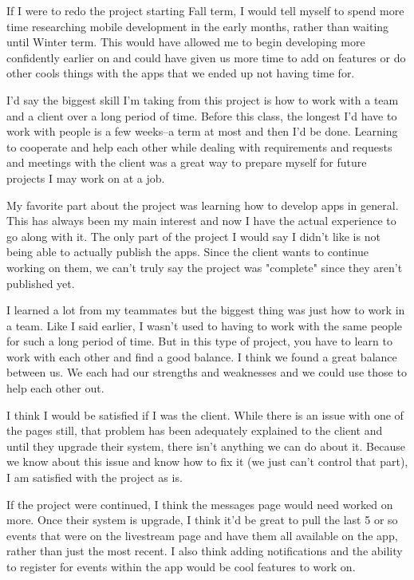 If I were to redo the project starting Fall term, I would tell myself to spend more time researching mobile development in the early months, rather than waiting until Winter term. This would have allowed me to begin developing more confidently earlier on and could have given us more time to add on features or do other cools things with the apps that we ended up not having time for.

I'd say the biggest skill I'm taking from this project is how to work with a team and a client over a long period of time. Before this class, the longest I'd have to work with people is a few weeks--a term at most and then I'd be done. Learning to cooperate and help each other while dealing with requirements and requests and meetings with the client was a great way to prepare myself for future projects I may work on at a job.

My favorite part about the project was learning how to develop apps in general. This has always been my main interest and now I have the actual experience to go along with it. The only part of the project I would say I didn't like is not being able to actually publish the apps. Since the client wants to continue working on them, we can't truly say the project was "complete" since they aren't published yet.

I learned a lot from my teammates but the biggest thing was just how to work in a team. Like I said earlier, I wasn't used to having to work with the same people for such a long period of time. But in this type of project, you have to learn to work with each other and find a good balance. I think we found a great balance between us. We each had our strengths and weaknesses and we could use those to help each other out.

I think I would be satisfied if I was the client. While there is an issue with one of the pages still, that problem has been adequately explained to the client and until they upgrade their system, there isn't anything we can do about it. Because we know about this issue and know how to fix it (we just can't control that part), I am satisfied with the project as is.

If the project were continued, I think the messages page would need worked on more. Once their system is upgrade, I think it'd be great to pull the last 5 or so events that were on the livestream page and have them all available on the app, rather than just the most recent. I also think adding notifications and the ability to register for events within the app would be cool features to work on.

